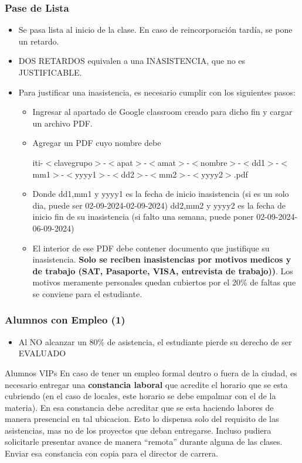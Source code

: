 \begin{frame}
\frametitle{Pase de Lista}
\begin{itemize}
\item Se pasa lista al inicio de la clase. En caso de reincorporaci\'on tard\'ia, se pone un retardo.
\item DOS RETARDOS equivalen a una INASISTENCIA, que no es JUSTIFICABLE.
\item Para justificar una inasistencia, es necesario cumplir con los siguientes pasos:
\begin{itemize}	 
\item Ingresar al apartado de Google classroom creado para dicho fin y cargar un archivo PDF. 
\item Agregar un PDF cuyo nombre debe 


iti-$<$clavegrupo$>$-$<$apat$>$-$<$amat$>$-$<$nombre$>$-$<$dd1$>$-$<$mm1$>$-$<$yyyy1$>$-$<$dd2$>$-$<$mm2$>$-$<$yyyy2$>$.pdf
\item Donde dd1,mm1 y yyyy1 es la fecha de inicio inasistencia (si es un solo dia, puede ser 02-09-2024-02-09-2024)
dd2,mm2 y yyyy2 es la fecha de inicio fin de su inasistencia (si falto una semana, puede poner 02-09-2024-06-09-2024)
\item El interior de ese PDF debe contener documento que justifique su inasistencia. \textbf{Solo se reciben inasistencias por motivos medicos y de trabajo (SAT, Pasaporte, VISA, entrevista de trabajo))}. Los motivos meramente personales quedan cubiertos por el 20\% de faltas que se conviene para el estudiante.  
\end{itemize}
\end{itemize}
\end{frame}


\begin{frame}
\frametitle{Alumnos con Empleo (1)}
\begin{itemize}
\item Al NO alcanzar un 80\% de asistencia, el estudiante pierde su derecho de ser EVALUADO
\end{itemize}
\begin{block}{Alumnos VIPs}
En caso de tener un empleo formal dentro o fuera de la ciudad, es necesario entregar una \textbf{constancia laboral} que acredite el horario que se esta cubriendo (en el caso de locales, este horario se debe empalmar con el de la materia). En esa constancia debe acreditar que se esta haciendo labores de manera presencial en tal ubicacion. Esto lo dispensa solo del requisito de las asistencias, mas no de los proyectos que deban entregarse. Incluso pudiera solicitarle presentar avance de manera ``remota'' durante alguna de las clases. Enviar esa constancia con copia para el director de carrera.
\end{block}
\end{frame}


